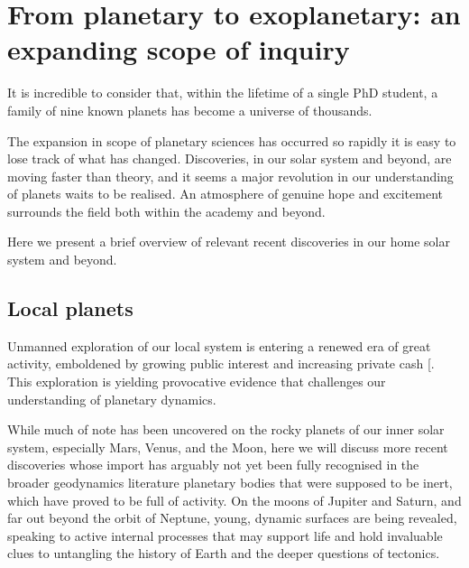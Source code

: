 \documentclass[letterpaper,10pt,english]{jupyterBook}
\begin{document}
\section{From planetary to exoplanetary: an expanding scope of inquiry}
\label{\detokenize{content/chapter_01_background/main:from-planetary-to-exoplanetary-an-expanding-scope-of-inquiry}}
\sphinxAtStartPar
It is incredible to consider that, within the lifetime of a single PhD student, a family of nine known planets has become a universe of thousands.

\sphinxAtStartPar
The expansion in scope of planetary sciences has occurred so rapidly it is easy to lose track of what has changed. Discoveries, in our solar system and beyond, are moving faster than theory, and it seems a major revolution in our understanding of planets waits to be realised. An atmosphere of genuine hope and excitement surrounds the field \sphinxhyphen{} both within the academy and beyond.

\sphinxAtStartPar
Here we present a brief overview of relevant recent discoveries in our home solar system and beyond.


\subsection{Local planets}
\label{\detokenize{content/chapter_01_background/main:local-planets}}
\sphinxAtStartPar
Unmanned exploration of our local system is entering a renewed era of great activity, emboldened by growing public interest and increasing private cash {[}\sphinxcite{references:id198}{]}. This exploration is yielding provocative evidence that challenges our understanding of planetary dynamics.

\sphinxAtStartPar
While much of note has been uncovered on the rocky planets of our inner solar system, especially Mars, Venus, and the Moon, here we will discuss more recent discoveries whose import has arguably not yet been fully recognised in the broader geodynamics literature \sphinxhyphen{} planetary bodies that were supposed to be inert, which have proved to be full of activity. On the moons of Jupiter and Saturn, and far out beyond the orbit of Neptune, young, dynamic surfaces are being revealed, speaking to active internal processes that may support life \sphinxhyphen{} and hold invaluable clues to untangling the history of Earth and the deeper questions of tectonics.
\end{document}
